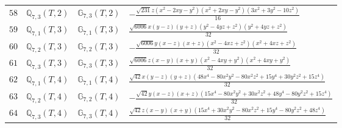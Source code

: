 \documentclass[fleqn,8pt,landscape]{jsarticle}
\begin{document}
\begin{table}[ht!]
\begin{center}
\begin{tabular}{cccl}
$ 58 $ & $ \mathbb{Q}_{7,3}(T,2) $ & $ \mathbb{G}_{7,3}(T,2) $ & $ - \frac{\sqrt{231} z \left(x^{2} - 2 x y - y^{2}\right) \left(x^{2} + 2 x y - y^{2}\right) \left(3 x^{2} + 3 y^{2} - 10 z^{2}\right)}{16} $ \\
$ 59 $ & $ \mathbb{Q}_{7,1}(T,3) $ & $ \mathbb{G}_{7,1}(T,3) $ & $ \frac{\sqrt{6006} x \left(y - z\right) \left(y + z\right) \left(y^{2} - 4 y z + z^{2}\right) \left(y^{2} + 4 y z + z^{2}\right)}{32} $ \\
$ 60 $ & $ \mathbb{Q}_{7,2}(T,3) $ & $ \mathbb{G}_{7,2}(T,3) $ & $ - \frac{\sqrt{6006} y \left(x - z\right) \left(x + z\right) \left(x^{2} - 4 x z + z^{2}\right) \left(x^{2} + 4 x z + z^{2}\right)}{32} $ \\
$ 61 $ & $ \mathbb{Q}_{7,3}(T,3) $ & $ \mathbb{G}_{7,3}(T,3) $ & $ \frac{\sqrt{6006} z \left(x - y\right) \left(x + y\right) \left(x^{2} - 4 x y + y^{2}\right) \left(x^{2} + 4 x y + y^{2}\right)}{32} $ \\
$ 62 $ & $ \mathbb{Q}_{7,1}(T,4) $ & $ \mathbb{G}_{7,1}(T,4) $ & $ \frac{\sqrt{42} x \left(y - z\right) \left(y + z\right) \left(48 x^{4} - 80 x^{2} y^{2} - 80 x^{2} z^{2} + 15 y^{4} + 30 y^{2} z^{2} + 15 z^{4}\right)}{32} $ \\
$ 63 $ & $ \mathbb{Q}_{7,2}(T,4) $ & $ \mathbb{G}_{7,2}(T,4) $ & $ - \frac{\sqrt{42} y \left(x - z\right) \left(x + z\right) \left(15 x^{4} - 80 x^{2} y^{2} + 30 x^{2} z^{2} + 48 y^{4} - 80 y^{2} z^{2} + 15 z^{4}\right)}{32} $ \\
$ 64 $ & $ \mathbb{Q}_{7,3}(T,4) $ & $ \mathbb{G}_{7,3}(T,4) $ & $ \frac{\sqrt{42} z \left(x - y\right) \left(x + y\right) \left(15 x^{4} + 30 x^{2} y^{2} - 80 x^{2} z^{2} + 15 y^{4} - 80 y^{2} z^{2} + 48 z^{4}\right)}{32} $ \\
 \hline \hline
\end{tabular}
\end{center}
\end{table}
\end{document}
